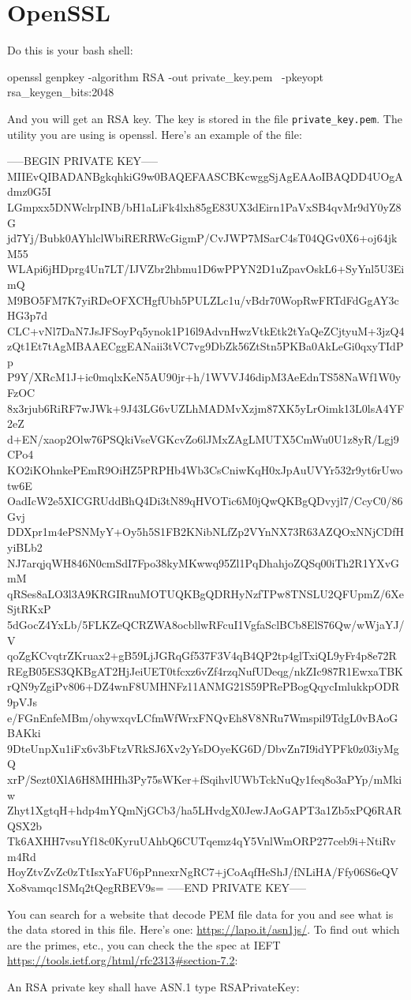 \section{OpenSSL}
\begin{ex}
  Do this is your bash shell:
  \begin{console}
openssl genpkey -algorithm RSA -out private_key.pem \
    -pkeyopt rsa_keygen_bits:2048
\end{console}
And you will get an RSA key. The key is stored in the file \verb!private_key.pem!.
The utility you are using is openssl.
Here's an example of the file:
{\scriptsize
\begin{console}
-----BEGIN PRIVATE KEY-----
MIIEvQIBADANBgkqhkiG9w0BAQEFAASCBKcwggSjAgEAAoIBAQDD4UOgAdmz0G5I
LGmpxx5DNWclrpINB/bH1aLiFk4lxh85gE83UX3dEirn1PaVxSB4qvMr9dY0yZ8G
jd7Yj/Bubk0AYhlclWbiRERRWcGigmP/CvJWP7MSarC4sT04QGv0X6+oj64jkM55
WLApi6jHDprg4Un7LT/IJVZbr2hbmu1D6wPPYN2D1uZpavOskL6+SyYnl5U3EimQ
M9BO5FM7K7yiRDeOFXCHgfUbh5PULZLc1u/vBdr70WopRwFRTdFdGgAY3cHG3p7d
CLC+vNl7DaN7JsJFSoyPq5ynok1P16l9AdvnHwzVtkEtk2tYaQeZCjtyuM+3jzQ4
zQt1Et7tAgMBAAECggEANaii3tVC7vg9DbZk56ZtStn5PKBa0AkLeGi0qxyTIdPp
P9Y/XRcM1J+ic0mqlxKeN5AU90jr+h/1WVVJ46dipM3AeEdnTS58NaWf1W0yFzOC
8x3rjub6RiRF7wJWk+9J43LG6vUZLhMADMvXzjm87XK5yLrOimk13L0lsA4YF2eZ
d+EN/xaop2Olw76PSQkiVseVGKcvZo6lJMxZAgLMUTX5CmWu0U1z8yR/Lgj9CPo4
KO2iKOhnkePEmR9OiHZ5PRPHb4Wb3CsCniwKqH0xJpAuUVYr532r9yt6rUwotw6E
OadIcW2e5XICGRUddBhQ4Di3tN89qHVOTic6M0jQwQKBgQDvyjl7/CcyC0/86Gvj
DDXpr1m4ePSNMyY+Oy5h5S1FB2KNibNLfZp2VYnNX73R63AZQOxNNjCDfHyiBLb2
NJ7arqjqWH846N0cmSdI7Fpo38kyMKwwq95Zl1PqDhahjoZQSq00iTh2R1YXvGmM
qRSes8aLO3l3A9KRGIRnuMOTUQKBgQDRHyNzfTPw8TNSLU2QFUpmZ/6XeSjtRKxP
5dGocZ4YxLb/5FLKZeQCRZWA8ocbllwRFcuI1VgfaSclBCb8ElS76Qw/wWjaYJ/V
qoZgKCvqtrZKruax2+gB59LjJGRqGf537F3V4qB4QP2tp4glTxiQL9yFr4p8e72R
REgB05ES3QKBgAT2HjJeiUET0tfcxz6vZf4rzqNufUDeqg/nkZIc987R1EwxaTBK
rQN9yZgiPv806+DZ4wnF8UMHNFz11ANMG21S59PRePBogQqycImlukkpODR9pVJs
e/FGnEnfeMBm/ohywxqvLCfmWfWrxFNQvEh8V8NRu7Wmspil9TdgL0vBAoGBAKki
9DteUnpXu1iFx6v3bFtzVRkSJ6Xv2yYsDOyeKG6D/DbvZn7I9idYPFk0z03iyMgQ
xrP/Sezt0XlA6H8MHHh3Py75sWKer+fSqihvlUWbTckNuQy1feq8o3aPYp/mMkiw
Zhyt1XgtqH+hdp4mYQmNjGCb3/ha5LHvdgX0JewJAoGAPT3a1Zb5xPQ6RARQSX2b
Tk6AXHH7vsuYf18c0KyruUAhbQ6CUTqemz4qY5VnlWmORP277ceb9i+NtiRvm4Rd
HoyZtvZvZc0zTtIsxYaFU6pPnnexrNgRC7+jCoAqfHeShJ/fNLiHA/Ffy06S6eQV
Xo8vamqc1SMq2tQegRBEV9s=
-----END PRIVATE KEY-----
\end{console}
}
You can search for a website that decode PEM file data for you
and see what is the data stored in this file.
Here's one: \url{https://lapo.it/asn1js/}.
To find out which are the primes, etc., you can check the the spec
at IEFT 
\url{https://tools.ietf.org/html/rfc2313#section-7.2}:
{\scriptsize
\begin{console}
An RSA private key shall have ASN.1 type RSAPrivateKey:


\end{console}}
\end{ex}

